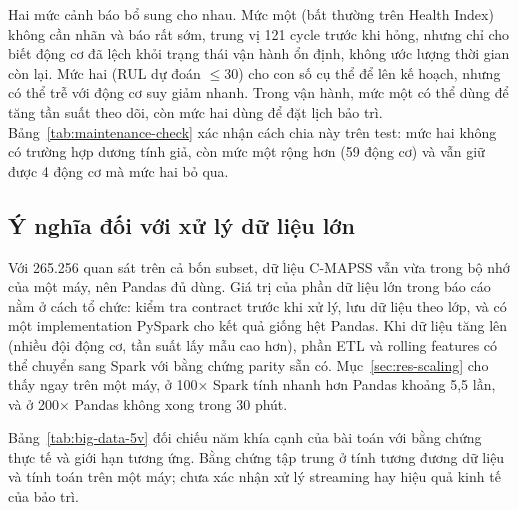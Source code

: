 Hai mức cảnh báo bổ sung cho nhau. Mức một (bất thường trên Health Index) không cần
nhãn và báo rất sớm, trung vị 121 cycle trước khi hỏng, nhưng chỉ cho biết động cơ
đã lệch khỏi trạng thái vận hành ổn định, không ước lượng thời gian còn lại. Mức hai (RUL dự đoán $\leq30$) cho
con số cụ thể để lên kế hoạch, nhưng có thể trễ với động cơ suy giảm nhanh. Trong
vận hành, mức một có thể dùng để tăng tần suất theo dõi, còn mức hai dùng để đặt
lịch bảo trì. Bảng~\ref{tab:maintenance-check} xác nhận cách chia này trên test:
mức hai không có trường hợp dương tính giả, còn mức một rộng hơn (59 động cơ) và vẫn giữ
được 4 động cơ mà mức hai bỏ qua.

\subsection{Ý nghĩa đối với xử lý dữ liệu lớn}
Với 265.256 quan sát trên cả bốn subset, dữ liệu C-MAPSS vẫn vừa trong bộ nhớ
của một máy, nên Pandas đủ dùng. Giá trị của phần dữ liệu lớn trong báo cáo nằm ở
cách tổ chức: kiểm tra contract trước khi xử lý, lưu dữ liệu theo lớp, và có một
implementation PySpark cho kết quả giống hệt Pandas. Khi dữ liệu tăng lên (nhiều
đội động cơ, tần suất lấy mẫu cao hơn), phần ETL và rolling features có thể chuyển
sang Spark với bằng chứng parity sẵn có. Mục~\ref{sec:res-scaling} cho thấy ngay trên một
máy, ở 100× Spark tính nhanh hơn Pandas khoảng 5,5 lần, và ở 200× Pandas không xong
trong 30 phút.

Bảng~\ref{tab:big-data-5v} đối chiếu năm khía cạnh của bài toán với bằng chứng thực
tế và giới hạn tương ứng. Bằng chứng tập trung ở tính tương đương dữ liệu và tính toán trên một máy; chưa xác nhận xử lý streaming hay hiệu quả kinh tế của bảo trì.

